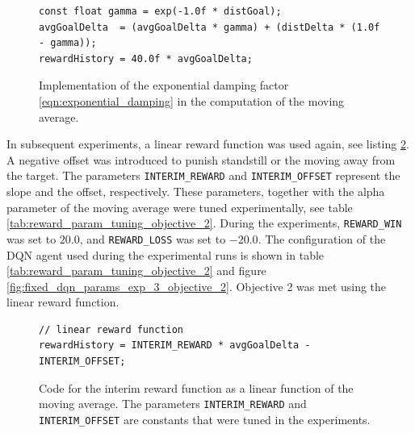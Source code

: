 \documentclass[11pt, onecolumn, oneside, reqno]{amsart}
\begin{document}
\begin{figure}[thpb]
\centering
\begin{lstlisting}
const float gamma = exp(-1.0f * distGoal);
avgGoalDelta  = (avgGoalDelta * gamma) + (distDelta * (1.0f - gamma));
rewardHistory = 40.0f * avgGoalDelta;
\end{lstlisting}
\caption{Implementation of the exponential damping factor \ref{eqn:exponential_damping} in the computation of the moving average.}
\label{fig:exponential_damping_moving_average}
\end{figure}

In subsequent experiments, a linear reward function was used again, see listing \ref{fig:linear_reward_function_objective_2}. A negative offset was introduced to punish standstill or the moving away from the target. The parameters \texttt{INTERIM\_REWARD} and \texttt{INTERIM\_OFFSET} represent the slope and the offset, respectively. These parameters, together with the alpha parameter of the moving average were tuned experimentally, see table \ref{tab:reward_param_tuning_objective_2}. During the experiments, \texttt{REWARD\_WIN} was set to $20.0$, and \texttt{REWARD\_LOSS} was set to $-20.0$.  The configuration of the DQN agent used during the experimental runs is shown in table \ref{tab:reward_param_tuning_objective_2} and figure \ref{fig:fixed_dqn_params_exp_3_objective_2}. Objective 2 was met using the linear reward function.

\begin{figure}[thpb]
\centering
\begin{lstlisting}
// linear reward function
rewardHistory = INTERIM_REWARD * avgGoalDelta - INTERIM_OFFSET;
\end{lstlisting}
\caption{Code for the interim reward function as a linear function of the moving average. The parameters \texttt{INTERIM\_REWARD} and \texttt{INTERIM\_OFFSET} are constants that were tuned in the experiments.}
\label{fig:linear_reward_function_objective_2}
\end{figure}
\end{document}
